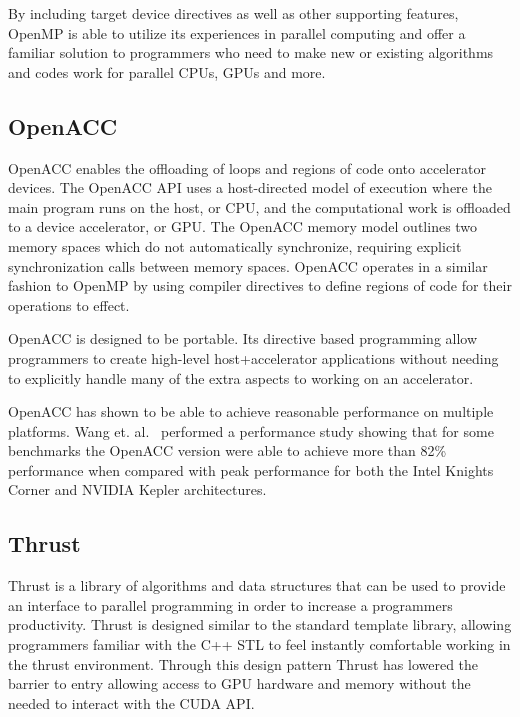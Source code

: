 By including target device directives as well as other supporting features, OpenMP is able to utilize its experiences in parallel computing and offer a familiar solution to programmers who need to make new or existing algorithms and codes work for parallel CPUs, GPUs and more.
\cite{ayguade2010extending}

\subsection*{\textbf{OpenACC}}

OpenACC enables the offloading of loops and regions of code onto accelerator devices.
%
The OpenACC API uses a host-directed model of execution where the main program runs on the host, or CPU, and the computational work is offloaded to a device accelerator, or GPU.
%
The OpenACC memory model outlines two memory spaces which do not automatically synchronize, requiring explicit synchronization calls between memory spaces.
%
OpenACC operates in a similar fashion to OpenMP by using compiler directives to define regions of code for their operations to effect.
\cite{wienke2012openacc}

OpenACC is designed to be portable.
%
Its directive based programming allow programmers to create high-level host+accelerator applications without needing to explicitly handle many of the extra aspects to working on an accelerator.
\cite{openacc}

OpenACC has shown to be able to achieve reasonable performance on multiple platforms.
%
Wang et. al.~\cite{wang2013performance} performed a performance study showing that for some benchmarks the OpenACC version were able to achieve more than 82\% performance when compared with peak performance for both the Intel Knights Corner and NVIDIA Kepler architectures.

\subsection*{\textbf{Thrust}}

Thrust is a library of algorithms and data structures that can be used to provide an interface to parallel programming in order to increase a programmers productivity.
%
Thrust is designed similar to the standard template library, allowing programmers familiar with the C++ STL to feel instantly comfortable working in the thrust environment.
%
Through this design pattern Thrust has lowered the barrier to entry allowing access to GPU hardware and memory without the needed to interact with the CUDA API.
%
\cite{hoberock2010thrust}

